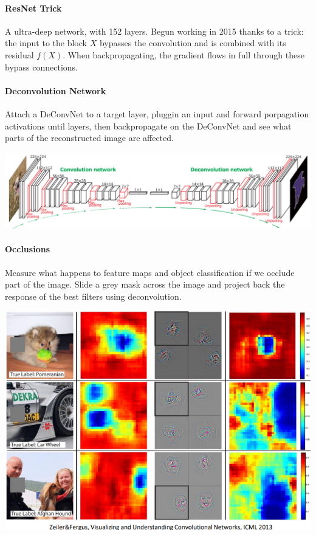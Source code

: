 \documentclass[10pt]{report}
\begin{document}
\paragraph{ResNet Trick} A ultra-deep network, with 152 layers. Begun working in 2015 thanks to a trick: the input to the block $X$ bypasses the convolution and is combined with its residual $f(X)$. When backpropagating, the gradient flows in full through these bypass connections.
\paragraph{Deconvolution Network} Attach a DeConvNet to a target layer, pluggin an input and forward porpagation activations until layers, then backpropagate on the DeConvNet and see what parts of the reconstructed image are affected.
\begin{center}
	\includegraphics[scale=0.5]{68.png}
\end{center}
\paragraph{Occlusions} Measure what happens to feature maps and object classification if we occlude part of the image. Slide a grey mask across the image and project back the response of the best filters using deconvolution.\begin{center}
	\includegraphics[scale=0.33]{83.png}
\end{center}
\end{document}
